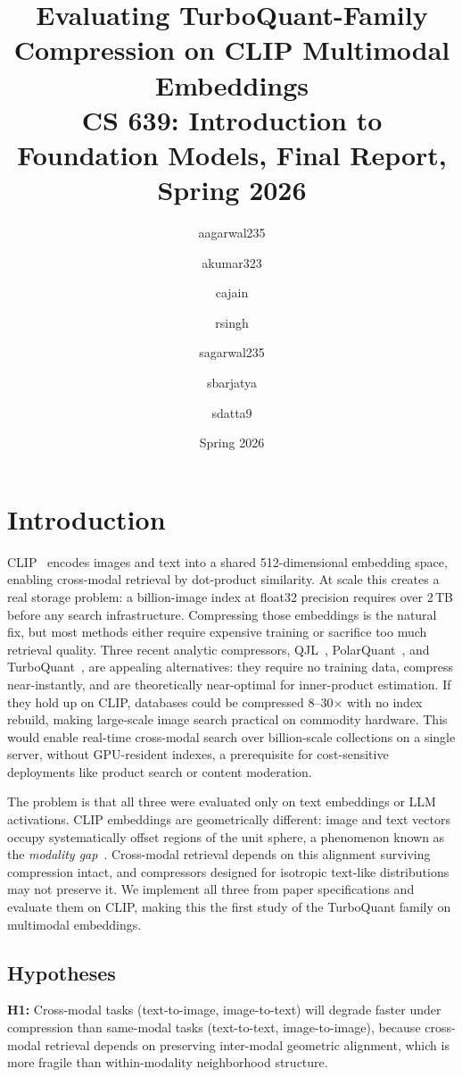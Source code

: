\documentclass[11pt]{article}
\title{%
    \large\textbf{Evaluating TurboQuant-Family Compression on CLIP Multimodal Embeddings}\\[0.4em]
    \normalsize CS 639: Introduction to Foundation Models, Final Report, Spring 2026
}
\author{%
    aagarwal235 \and
    akumar323 \and
    cajain \and
    rsingh \and
    sagarwal235 \and
    sbarjatya \and
    sdatta9
}
\date{Spring 2026}
\begin{document}
\maketitle

\section{Introduction}

CLIP~\cite{radford2021clip} encodes images and text into a shared 512-dimensional embedding space,
enabling cross-modal retrieval by dot-product similarity. At scale this creates a real storage problem:
a billion-image index at float32 precision requires over 2\,TB before any search infrastructure.
Compressing those embeddings is the natural fix, but most methods either require expensive training or
sacrifice too much retrieval quality. Three recent analytic compressors, QJL~\cite{zandieh2024qjl},
PolarQuant~\cite{han2026polarquant}, and TurboQuant~\cite{zandieh2026turboquant}, are appealing
alternatives: they require no training data, compress near-instantly, and are theoretically near-optimal
for inner-product estimation. If they hold up on CLIP, databases could be compressed 8--30$\times$ with
no index rebuild, making large-scale image search practical on commodity hardware. This would enable
real-time cross-modal search over billion-scale collections on a single server, without GPU-resident
indexes, a prerequisite for cost-sensitive deployments like product search or content moderation.

The problem is that all three were evaluated only on text embeddings or LLM activations. CLIP embeddings
are geometrically different: image and text vectors occupy systematically offset regions of the unit
sphere, a phenomenon known as the \textit{modality gap}~\cite{liang2022gap}. Cross-modal retrieval
depends on this alignment surviving compression intact, and compressors designed for isotropic
text-like distributions may not preserve it. We implement all three from paper specifications and
evaluate them on CLIP, making this the first study of the TurboQuant family on multimodal embeddings.

\subsection*{Hypotheses}
\textbf{H1:} Cross-modal tasks (text-to-image, image-to-text) will degrade faster under compression than
same-modal tasks (text-to-text, image-to-image), because cross-modal retrieval depends on preserving
inter-modal geometric alignment, which is more fragile than within-modality neighborhood structure.
\end{document}
